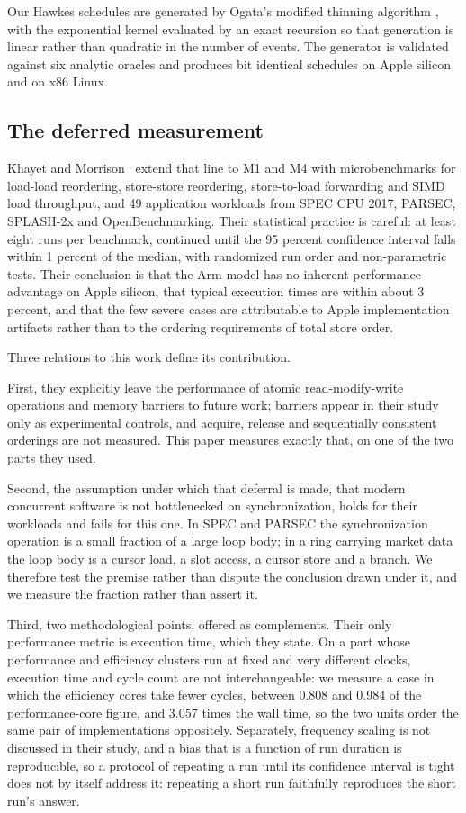 \documentclass[conference]{IEEEtran}
\begin{document}
Our Hawkes schedules are generated by Ogata's modified thinning algorithm
\cite{ogata1981thinning}, with the exponential kernel evaluated by an exact
recursion so that generation is linear rather than quadratic in the number of
events. The generator is validated against six analytic oracles and produces
bit identical schedules on Apple silicon and on x86 Linux.

\subsection{The deferred measurement}

Khayet and Morrison~\cite{khayet2026arm} extend that line to M1 and M4 with
microbenchmarks for load-load reordering, store-store reordering,
store-to-load forwarding and SIMD load throughput, and 49 application workloads
from SPEC CPU 2017, PARSEC, SPLASH-2x and OpenBenchmarking. Their statistical
practice is careful: at least eight runs per benchmark, continued until the 95
percent confidence interval falls within 1 percent of the median, with
randomized run order and non-parametric tests. Their conclusion is that the Arm
model has no inherent performance advantage on Apple silicon, that typical
execution times are within about 3 percent, and that the few severe cases are
attributable to Apple implementation artifacts rather than to the ordering
requirements of total store order.

Three relations to this work define its contribution.

First, they explicitly leave the performance of atomic read-modify-write
operations and memory barriers to future work; barriers appear in their study
only as experimental controls, and acquire, release and sequentially consistent
orderings are not measured. This paper measures exactly that, on one of the two
parts they used.

Second, the assumption under which that deferral is made, that modern
concurrent software is not bottlenecked on synchronization, holds for their
workloads and fails for this one. In SPEC and PARSEC the synchronization
operation is a small fraction of a large loop body; in a ring carrying market
data the loop body is a cursor load, a slot access, a cursor store and a
branch. We therefore test the premise rather than dispute the conclusion drawn
under it, and we measure the fraction rather than assert it.

Third, two methodological points, offered as complements. Their only
performance metric is execution time, which they state. On a part whose
performance and efficiency clusters run at fixed and very different clocks,
execution time and cycle count are not interchangeable: we measure a case in
which the efficiency cores take fewer cycles, between 0.808 and 0.984 of the
performance-core figure, and 3.057 times the wall time, so the two units order
the same pair of implementations oppositely. Separately, frequency scaling is
not discussed in their study, and a bias that is a function of run duration is
reproducible, so a protocol of repeating a run until its confidence interval is
tight does not by itself address it: repeating a short run faithfully
reproduces the short run's answer.
\end{document}

